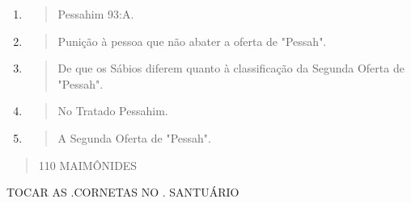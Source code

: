 \begin{enumerate}
\def\labelenumi{\arabic{enumi}.}
\setcounter{enumi}{77}
\item
  \begin{quote}
  Pessahim 93:A.
  \end{quote}
\item
  \begin{quote}
  Punição à pessoa que não abater a oferta de "Pessah".
  \end{quote}
\item
  \begin{quote}
  De que os Sábios diferem quanto à classificação da Segunda Oferta de
  "Pessah".
  \end{quote}
\item
  \begin{quote}
  No Tratado Pessahim.
  \end{quote}
\item
  \begin{quote}
  A Segunda Oferta de "Pessah".
  \end{quote}
\end{enumerate}

\begin{quote}
110 MAIMÔNIDES
\end{quote}

TOCAR AS .CORNETAS NO . SANTUÁRIO


